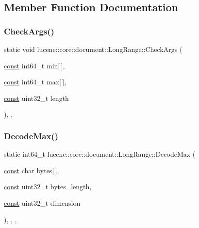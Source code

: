 \subsection{Member Function Documentation}
\mbox{\label{classlucene_1_1core_1_1document_1_1LongRange_aa40ee6dae88377490b2ee570d9ff84bf}} 
\subsubsection{\texorpdfstring{Check\+Args()}{CheckArgs()}}
{\footnotesize\ttfamily static void lucene\+::core\+::document\+::\+Long\+Range\+::\+Check\+Args (\begin{DoxyParamCaption}\item[{\mbox{\hyperlink{ZlibCrc32_8h_a2c212835823e3c54a8ab6d95c652660e}{const}} int64\+\_\+t}]{min\mbox{[}$\,$\mbox{]},  }\item[{\mbox{\hyperlink{ZlibCrc32_8h_a2c212835823e3c54a8ab6d95c652660e}{const}} int64\+\_\+t}]{max\mbox{[}$\,$\mbox{]},  }\item[{\mbox{\hyperlink{ZlibCrc32_8h_a2c212835823e3c54a8ab6d95c652660e}{const}} uint32\+\_\+t}]{length }\end{DoxyParamCaption})\hspace{0.3cm}{\ttfamily [inline]}, {\ttfamily [static]}, {\ttfamily [private]}}

\mbox{\label{classlucene_1_1core_1_1document_1_1LongRange_ae16e60bb4f29ab3c1b2a2261addbbe50}} 
\subsubsection{\texorpdfstring{Decode\+Max()}{DecodeMax()}}
{\footnotesize\ttfamily static int64\+\_\+t lucene\+::core\+::document\+::\+Long\+Range\+::\+Decode\+Max (\begin{DoxyParamCaption}\item[{\mbox{\hyperlink{ZlibCrc32_8h_a2c212835823e3c54a8ab6d95c652660e}{const}} char}]{bytes\mbox{[}$\,$\mbox{]},  }\item[{\mbox{\hyperlink{ZlibCrc32_8h_a2c212835823e3c54a8ab6d95c652660e}{const}} uint32\+\_\+t}]{bytes\+\_\+length,  }\item[{\mbox{\hyperlink{ZlibCrc32_8h_a2c212835823e3c54a8ab6d95c652660e}{const}} uint32\+\_\+t}]{dimension }\end{DoxyParamCaption})\hspace{0.3cm}{\ttfamily [inline]}, {\ttfamily [static]}, {\ttfamily [private]}, {\ttfamily [noexcept]}}

